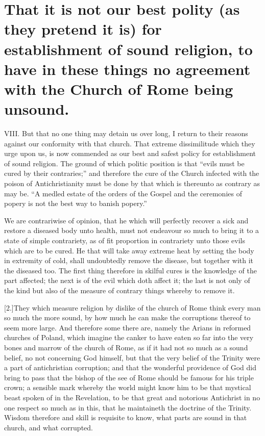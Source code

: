 \section*{That it is not our best polity (as they pretend it is) for establishment of sound religion, to have in these things no agreement with the Church of Rome being unsound.}

VIII. But that no one thing may detain us over long, I return to their reasons against our conformity with that church. That extreme dissimilitude which they urge upon us, is now commended as our best and safest policy for establishment of sound religion. The ground of which politic position is that “evils must be cured by their contraries;” and therefore the cure of the Church infected with the poison of Antichristianity must be done by that which is thereunto as contrary as may be. “A medled estate of the orders of the Gospel and the ceremonies of popery is not the best way to banish popery.”

We are contrariwise of opinion, that he which will perfectly recover a sick and restore a diseased body unto health, must not endeavour so much to bring it to a state of simple contrariety, as of fit proportion in contrariety unto those evils which are to be cured. He that will take away extreme heat by setting the body in extremity of cold, shall undoubtedly remove the disease, but together with it the diseased too. The first thing therefore in skilful cures is the knowledge of the part affected; the next is of the evil which doth affect it; the last is not only of the kind but also of the measure of contrary things whereby to remove it.


[2.]They which measure religion by dislike of the church of Rome think every man so much the more sound, by how much he can make the corruptions thereof to seem more large. And therefore some there are, namely the Arians in reformed churches of Poland, which imagine the canker to have eaten so far into the very bones and marrow of the church of Rome, as if it had not so much as a sound belief, no not concerning God himself, but that the very belief of the Trinity were a part of antichristian corruption; and that the wonderful providence of God did bring to pass that the bishop of the see of Rome should be famous for his triple crown; a sensible mark whereby the world might know him to be that mystical beast spoken of in the Revelation, to be that great and notorious Antichrist in no one respect so much as in this, that he maintaineth the doctrine of the Trinity. Wisdom therefore and skill is requisite to know, what parts are sound in that church, and what corrupted.

